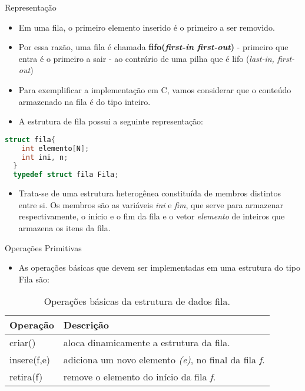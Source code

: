 \begin{frame}[fragile]{Representação}
\begin{itemize}
	\item Em uma fila, o \alert{primeiro} elemento inserido é o primeiro a ser removido.
	\item Por essa razão, uma fila é chamada \textbf{\alert{fifo(\textit{first-in first-out})}} - primeiro que entra é o primeiro a sair - ao contrário de uma pilha que é \alert{lifo} (\textit{last-in, first-out})
	\item Para exemplificar a implementação em C, vamos considerar que o conteúdo armazenado na fila é do tipo inteiro.
	\item A estrutura de fila possui a seguinte representação:	
\end{itemize}
\footnotesize
\begin{lstlisting}[language=C]
  struct fila{
    int elemento[N];
    int ini, n;
  }
  typedef struct fila Fila;
\end{lstlisting}
\begin{itemize}
	\item Trata-se de uma estrutura heterogênea constituída de membros distintos entre si. Os membros são as variáveis \alert{\textit{ini}} e \alert{\textit{fim}}, que serve para armazenar respectivamente, o início e o fim da fila e o vetor \alert{\textit{elemento}} de inteiros que armazena os itens da fila.
\end{itemize}
\end{frame}

\begin{frame}{Operações Primitivas}
  \begin{itemize}
	  \item As operações básicas que devem ser implementadas em uma estrutura do tipo Fila são:		
  \end{itemize}
  \begin{table}[ht]
			  \centering
						\begin{tabular}{l|l}
						    \hline \textbf{Operação} & \textbf{Descrição} \\
						    \hline criar() & aloca dinamicamente a estrutura da fila.\\
						    \hline insere(f,e) & adiciona um novo elemento \textit{(e)}, no final da fila \textit{f}.\\
						    \hline retira(f) & remove o elemento do início da fila \textit{f}.\\						   
						    \hline 
						\end{tabular}
						\caption{Operações básicas da estrutura de dados fila.}
				\end{table}
\end{frame}
 
